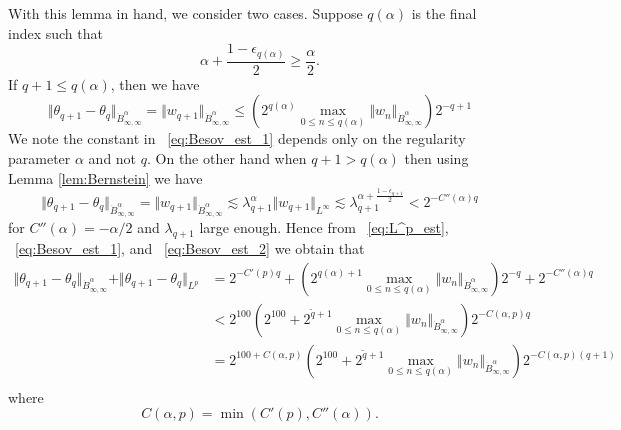 \documentclass[12pt,reqno,letterpaper]{amsart}
\numberwithin{equation}{section}
\newcommand{\1}{{\bf 1}}
\newcommand{\2}{{\bf 2}}
\theoremstyle{remark}
\theoremstyle{remark}
\begin{document}
With this lemma in hand, we consider two cases. Suppose $q(\alpha)$ is the final index such that
$$
\alpha + \frac{1 - \epsilon_{q(\alpha)}}{2} \geq \frac{\alpha}{2}.
$$
If $q + 1 \leq q(\alpha)$, then we have
\begin{equation}\label{eq:Besov_est_1}
    \Vert \theta_{q+1} - \theta_q \Vert_{\dot{B}^\alpha_{\infty,\infty}} = \Vert w_{q+1} \Vert_{\dot{B}^\alpha_{\infty,\infty}} \leq \left(2^{q(\alpha)}\max_{0 \leq n \leq q(\alpha)} \Vert w_n \Vert_{\dot{B}^\alpha_{\infty,\infty}}\right)  2^{-q+1}
\end{equation}
We note the constant in ~\eqref{eq:Besov_est_1} depends only on the regularity parameter $\alpha$ and not $q$. On the other hand when $q + 1 > q(\alpha)$ then using Lemma \ref{lem:Bernstein} we have
\begin{equation}\label{eq:Besov_est_2}
    \Vert \theta_{q+1} - \theta_q \Vert_{\dot{B}^\alpha_{\infty,\infty}} = \Vert w_{q+1} \Vert_{\dot{B}^\alpha_{\infty,\infty}}\lesssim \lambda_{q+1}^{\alpha} \Vert w_{q+1} \Vert_{L^\infty} \lesssim \lambda_{q+1}^{\alpha + \frac{1-\epsilon_{q+1}}{2}} < 2^{-C''(\alpha)q}
\end{equation}
for $C''(\alpha) = -\alpha/2$ and $\lambda_{q+1}$ large enough. Hence from ~\eqref{eq:L^p_est}, ~\eqref{eq:Besov_est_1}, and ~\eqref{eq:Besov_est_2} we obtain that
\begin{equation*}
\begin{split}
    \Vert \theta_{q+1} - \theta_q \Vert_{\dot{B}^\alpha_{\infty,\infty}} + \Vert \theta_{q+1} - \theta_q \Vert_{L^p} &= 2^{-C'(p)q} + \left(2^{q(\alpha)+1} \max_{0 \leq n \leq q(\alpha)} \Vert w_{n} \Vert_{\dot{B}^\alpha_{\infty,\infty}}\right) 2^{-q} + 2^{-C''(\alpha)q}\\
    &< 2^{100}\left(2^{100} + 2^{\tilde{q}+1} \max_{0 \leq n \leq q(\alpha)} \Vert w_n \Vert_{\dot{B}^\alpha_{\infty,\infty}}\right) 2^{-C(\alpha,p)q}\\
    &= 2^{100 + C(\alpha,p)}\left(2^{100} + 2^{\tilde{q}+1} \max_{0 \leq n \leq q(\alpha)} \Vert w_n \Vert_{\dot{B}^\alpha_{\infty,\infty}}\right) 2^{-C(\alpha,p)(q+1)}\\
    \end{split}
\end{equation*}
where
$$
C(\alpha,p) = \min\left(C'(p),C''(\alpha)\right).
$$
\end{document}
